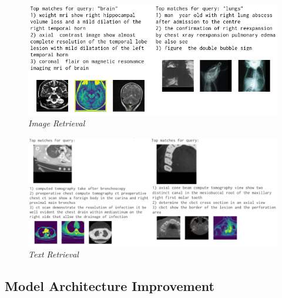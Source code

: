 \documentclass[10pt,twocolumn,letterpaper]{article}
\begin{document}
\begin{figure}[h]
   \centering
   \includegraphics[width=0.8\linewidth]{img/T2I_test_compact.png}
   \caption{\textit{Image Retrieval}}
   \label{fig:iret}
\end{figure}

\begin{figure}[h]
   \centering
   \includegraphics[width=1\linewidth]{img/I2T_test_compact.png}
   \caption{\textit{Text Retrieval}}
   \label{fig:tret}
\end{figure}


\subsection{Model Architecture Improvement}

\end{document}

